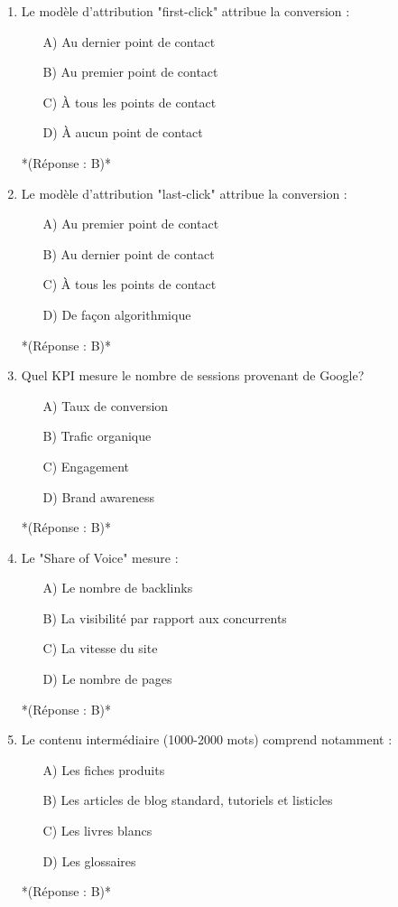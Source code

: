 \documentclass[12pt,a4paper,twoside]{report}
\begin{document}
\begin{enumerate}
\item Le modèle d'attribution "first-click" attribue la conversion :
\begin{itemize}
\item[A)] Au dernier point de contact
\item[B)] Au premier point de contact
\item[C)] À tous les points de contact
\item[D)] À aucun point de contact
\end{itemize}
*(Réponse : B)*

\item Le modèle d'attribution "last-click" attribue la conversion :
\begin{itemize}
\item[A)] Au premier point de contact
\item[B)] Au dernier point de contact
\item[C)] À tous les points de contact
\item[D)] De façon algorithmique
\end{itemize}
*(Réponse : B)*

\item Quel KPI mesure le nombre de sessions provenant de Google?
\begin{itemize}
\item[A)] Taux de conversion
\item[B)] Trafic organique
\item[C)] Engagement
\item[D)] Brand awareness
\end{itemize}
*(Réponse : B)*

\item Le "Share of Voice" mesure :
\begin{itemize}
\item[A)] Le nombre de backlinks
\item[B)] La visibilité par rapport aux concurrents
\item[C)] La vitesse du site
\item[D)] Le nombre de pages
\end{itemize}
*(Réponse : B)*

\item Le contenu intermédiaire (1000-2000 mots) comprend notamment :
\begin{itemize}
\item[A)] Les fiches produits
\item[B)] Les articles de blog standard, tutoriels et listicles
\item[C)] Les livres blancs
\item[D)] Les glossaires
\end{itemize}
*(Réponse : B)*


\end{enumerate}
\end{document}
